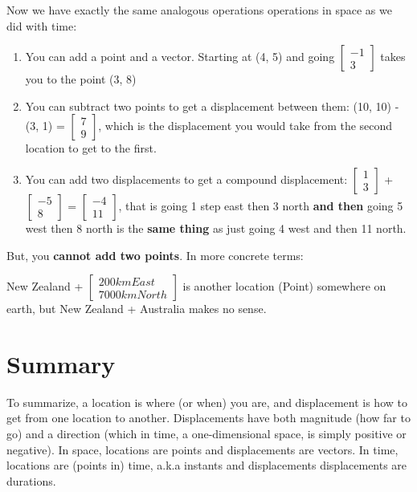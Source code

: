 \documentclass{article}
\begin{document}
Now we have exactly the same analogous operations operations in space as we did with time:

\begin{enumerate}
    \item You can add a point and a vector. Starting at (4, 5) and going $\begin{bmatrix} -1 \\ 3 \end{bmatrix}$ takes you to the point (3, 8)
    \item You can subtract two points to get a displacement between them: (10, 10) - (3, 1) = $\begin{bmatrix} 7 \\ 9 \end{bmatrix}$, which is the displacement you would take from the second location to get to the first.
    \item You can add two displacements to get a compound displacement: $\begin{bmatrix} 1 \\ 3 \end{bmatrix}$ + $\begin{bmatrix} -5 \\ 8 \end{bmatrix}$ = $\begin{bmatrix} -4 \\ 11 \end{bmatrix}$, that is going 1 step east then 3 north \textbf{and then} going 5 west then 8 north is the \textbf{same thing} as just going 4 west and then 11 north.

\end{enumerate}

But, you \textbf{cannot add two points}. In more concrete terms:

New Zealand + $\begin{bmatrix} 200km East \\ 7000km North \end{bmatrix}$ is another location (Point) somewhere on earth, but New Zealand + Australia makes no sense.

\section{Summary}

To summarize, a location is where (or when) you are, and displacement is how to get from one location to another. Displacements have both magnitude (how far to go) and a direction (which in time, a one-dimensional space, is simply positive or negative). In space, locations are points and displacements are vectors. In time, locations are (points in) time, a.k.a instants and displacements displacements are durations.
\end{document}
